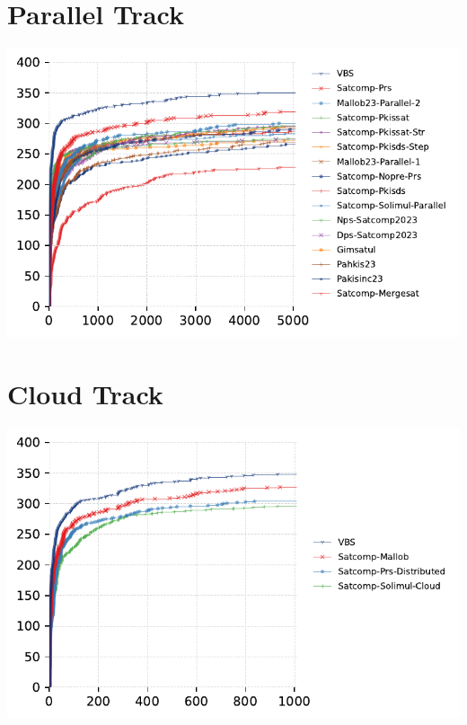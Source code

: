 \documentclass{article}
\begin{document}
\section{Parallel Track}
\includegraphics[width=\linewidth]{gen/sc2023/parallel/cdf.pdf}



\section{Cloud Track}
\includegraphics[width=\linewidth]{gen/sc2023/cloud/cdf.pdf}

\end{document}
